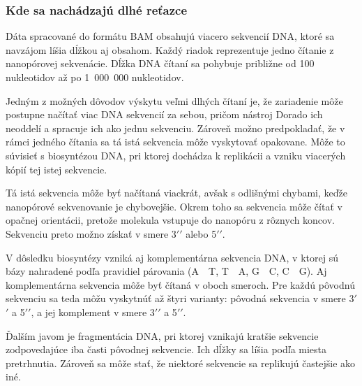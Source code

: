 \subsubsection{Kde sa nachádzajú dlhé reťazce}
Dáta spracované do formátu BAM obsahujú viacero sekvencií DNA, ktoré sa navzájom líšia dĺžkou aj obsahom.
Každý riadok reprezentuje jedno čítanie z nanopórovej sekvenácie.
Dĺžka DNA čítaní sa pohybuje približne od 100 nukleotidov až po 1~000~000 nukleotidov.

Jedným z možných dôvodov výskytu veľmi dlhých čítaní je, že zariadenie môže postupne načítať viac DNA sekvencií za sebou, pričom nástroj Dorado ich neoddelí a spracuje ich ako jednu sekvenciu.
Zároveň možno predpokladať, že v rámci jedného čítania sa tá istá sekvencia môže vyskytovať opakovane.
Môže to súvisieť s biosyntézou DNA, pri ktorej dochádza k replikácii a vzniku viacerých kópií tej istej sekvencie.

Tá istá sekvencia môže byť načítaná viackrát, avšak s odlišnými chybami, keďže nanopórové sekvenovanie je chybovejšie.
Okrem toho sa sekvencia môže čítať v opačnej orientácii, pretože molekula vstupuje do nanopóru z rôznych koncov.
Sekvenciu preto možno získať v smere 3$'$$'$ alebo 5$'$$'$.

V dôsledku biosyntézy vzniká aj komplementárna sekvencia DNA, v ktorej sú bázy nahradené podľa pravidiel párovania (A~\textrightarrow~T, T~\textrightarrow~A, G~\textrightarrow~C, C~\textrightarrow~G).
Aj komplementárna sekvencia môže byť čítaná v oboch smeroch.
Pre každú pôvodnú sekvenciu sa teda môžu vyskytnúť až štyri varianty: pôvodná sekvencia v smere 3$'$$'$ a 5$'$$'$, a jej komplement v smere 3$'$$'$ a 5$'$$'$.

Ďalším javom je fragmentácia DNA, pri ktorej vznikajú kratšie sekvencie zodpovedajúce iba časti pôvodnej sekvencie.
Ich dĺžky sa líšia podľa miesta pretrhnutia.
Zároveň sa môže stať, že niektoré sekvencie sa replikujú častejšie ako iné.

